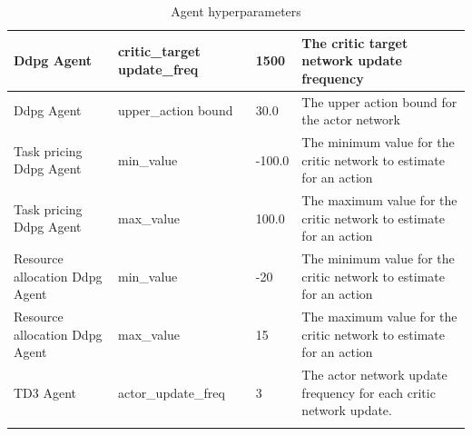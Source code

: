 \begin{longtable}{|p{2cm}|p{3.5cm}|p{2.5cm}|p{6cm}|}
        Ddpg Agent & critic\_target update\_freq & 1500 & The critic target network update frequency \\ \hline
        Ddpg Agent & upper\_action bound & 30.0 & The upper action bound for the actor network \\ \hline
        Task pricing Ddpg Agent & min\_value & -100.0 & The minimum value for the critic network to estimate for an
            action \\ \hline
        Task pricing Ddpg Agent & max\_value & 100.0 & The maximum value for the critic network to estimate for an
            action\\ \hline
        Resource allocation Ddpg Agent & min\_value & -20 & The minimum value for the critic network to estimate for an
            action \\ \hline
        Resource allocation Ddpg Agent & max\_value & 15 & The maximum value for the critic network to estimate for an
            action\\ \hline
        TD3 Agent & actor\_update\_freq & 3 & The actor network update frequency for each critic network update. \\ \hline
    \caption{Agent hyperparameters}
    \label{tab:agent_hyperparameters}
\end{longtable}


